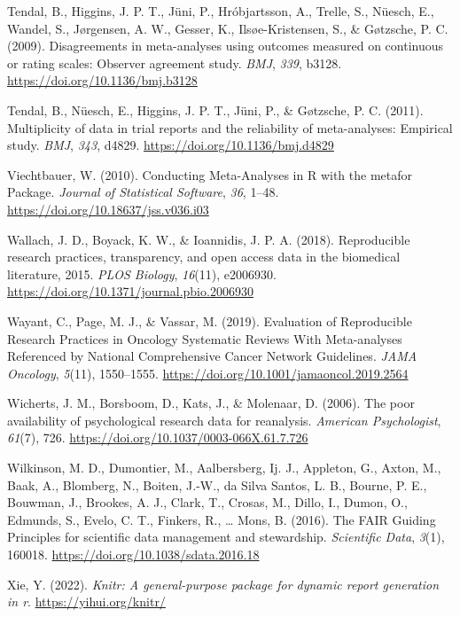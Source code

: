 \documentclass[
  ,jou, a4paper,floatsintext]{apa6}
\newlength{\cslhangindent}
\newlength{\cslentryspacingunit} %
\newenvironment{CSLReferences}[2] %
 {%
  \setlength{\parindent}{0pt}
  \ifodd #1
  \let\oldpar\par
  \def\par{\hangindent=\cslhangindent\oldpar}
  \fi
  \setlength{\parskip}{#2\cslentryspacingunit}
 }%
 {}
\begin{document}
\begin{CSLReferences}{1}{0}
\leavevmode{}%
Tendal, B., Higgins, J. P. T., Jüni, P., Hróbjartsson, A., Trelle, S., Nüesch, E., Wandel, S., Jørgensen, A. W., Gesser, K., Ilsøe-Kristensen, S., \& Gøtzsche, P. C. (2009). Disagreements in meta-analyses using outcomes measured on continuous or rating scales: Observer agreement study. \emph{BMJ}, \emph{339}, b3128. \url{https://doi.org/10.1136/bmj.b3128}

\leavevmode{}%
Tendal, B., Nüesch, E., Higgins, J. P. T., Jüni, P., \& Gøtzsche, P. C. (2011). Multiplicity of data in trial reports and the reliability of meta-analyses: Empirical study. \emph{BMJ}, \emph{343}, d4829. \url{https://doi.org/10.1136/bmj.d4829}

\leavevmode{}%
Viechtbauer, W. (2010). Conducting {Meta-Analyses} in {R} with the metafor {Package}. \emph{Journal of Statistical Software}, \emph{36}, 1--48. \url{https://doi.org/10.18637/jss.v036.i03}

\leavevmode{}%
Wallach, J. D., Boyack, K. W., \& Ioannidis, J. P. A. (2018). Reproducible research practices, transparency, and open access data in the biomedical literature, 2015. \emph{PLOS Biology}, \emph{16}(11), e2006930. \url{https://doi.org/10.1371/journal.pbio.2006930}

\leavevmode{}%
Wayant, C., Page, M. J., \& Vassar, M. (2019). Evaluation of {Reproducible} {Research} {Practices} in {Oncology} {Systematic} {Reviews} {With} {Meta}-analyses {Referenced} by {National} {Comprehensive} {Cancer} {Network} {Guidelines}. \emph{JAMA Oncology}, \emph{5}(11), 1550--1555. \url{https://doi.org/10.1001/jamaoncol.2019.2564}

\leavevmode{}%
Wicherts, J. M., Borsboom, D., Kats, J., \& Molenaar, D. (2006). The poor availability of psychological research data for reanalysis. \emph{American Psychologist}, \emph{61}(7), 726. \url{https://doi.org/10.1037/0003-066X.61.7.726}

\leavevmode{}%
Wilkinson, M. D., Dumontier, M., Aalbersberg, Ij. J., Appleton, G., Axton, M., Baak, A., Blomberg, N., Boiten, J.-W., da Silva Santos, L. B., Bourne, P. E., Bouwman, J., Brookes, A. J., Clark, T., Crosas, M., Dillo, I., Dumon, O., Edmunds, S., Evelo, C. T., Finkers, R., \ldots{} Mons, B. (2016). The {FAIR Guiding Principles} for scientific data management and stewardship. \emph{Scientific Data}, \emph{3}(1), 160018. \url{https://doi.org/10.1038/sdata.2016.18}

\leavevmode{}%
Xie, Y. (2022). \emph{Knitr: A general-purpose package for dynamic report generation in r}. \url{https://yihui.org/knitr/}

\end{CSLReferences}
\end{document}
